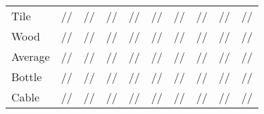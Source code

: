 \documentclass[lettersize,journal]{IEEEtran}
\begin{document}
\begin{table*}[htbp]
{\begin{tabular}{lccccccccc}
      Tile         & //                                       & /{\color{blue}{}}/                                                 & //                                                  & {\color{blue}{}}//{\color{blue}{}}                        & //                                                 & //                                            & //                                     & {\color{red}{}}/{\color{red}{}}/{\color{red}{}}    & //                                                                            \\
      Wood         & //                                       & //                                                                          & //                                                  & //                                                                          & {\color{red}{}}//{\color{red}{}} & /{\color{red}{}}/                    & //                                     & //{\color{red}{}}                                                    & {\color{blue}{}}/{\color{blue}{}}/{\color{blue}{}} \\\hline
      Average      & //                                       & //                                                                          & //                                                  & //                                                                          & //                                                 & /{\color{blue}{}}/                   & //                                     & {\color{red}{}}/{\color{red}{}}/{\color{red}{}}    & {\color{blue}{}}/{\color{red}{}}/{\color{blue}{}}  \\\hline
      Bottle       & //                                       & //                                                                          & //                                                  & //                                                                          & //                                                 & //                                            & //                                     & {\color{red}{}}/{\color{red}{}}/{\color{red}{}}    & {\color{blue}{}}/{\color{blue}{}}/{\color{blue}{}} \\
      Cable        & //                                       & //                                                                          & //                                                  & //                                                                          & //                                                 & //                                            & //                                     & {\color{blue}{}}/{\color{red}{}}/{\color{blue}{}}  & {\color{red}{}}/{\color{blue}{}}/{\color{red}{}}   \\

\end{tabular}}
\end{table*}
\end{document}
